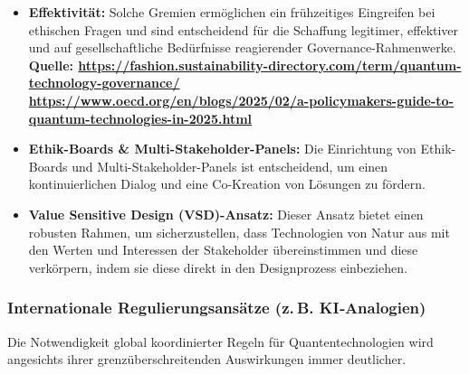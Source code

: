 \begin{itemize}
    \item \textbf{Effektivität:} Solche Gremien ermöglichen ein frühzeitiges Eingreifen bei ethischen Fragen und sind entscheidend für die Schaffung legitimer, effektiver und auf gesellschaftliche Bedürfnisse reagierender Governance-Rahmenwerke. \textbf{Quelle: \href{https://fashion.sustainability-directory.com/term/quantum-technology-governance/}{https://fashion.sustainability-directory.com/term/quantum-technology-governance/} \href{https://www.oecd.org/en/blogs/2025/02/a-policymakers-guide-to-quantum-technologies-in-2025.html}{https://www.oecd.org/en/blogs/2025/02/a-policymakers-guide-to-quantum-technologies-in-2025.html}}
\end{itemize}
\begin{itemize}
    \item \textbf{Ethik-Boards \& Multi-Stakeholder-Panels:} Die Einrichtung von Ethik-Boards und Multi-Stakeholder-Panels ist entscheidend, um einen kontinuierlichen Dialog und eine Co-Kreation von Lösungen zu fördern.
\end{itemize}
\begin{itemize}
    \item \textbf{Value Sensitive Design (VSD)-Ansatz:} Dieser Ansatz bietet einen robusten Rahmen, um sicherzustellen, dass Technologien von Natur aus mit den Werten und Interessen der Stakeholder übereinstimmen und diese verkörpern, indem sie diese direkt in den Designprozess einbeziehen.
\end{itemize}


\subsubsection{Internationale Regulierungsansätze (z. B. KI‑Analogien)}
Die Notwendigkeit global koordinierter Regeln für Quantentechnologien wird angesichts ihrer grenzüberschreitenden Auswirkungen immer deutlicher.

